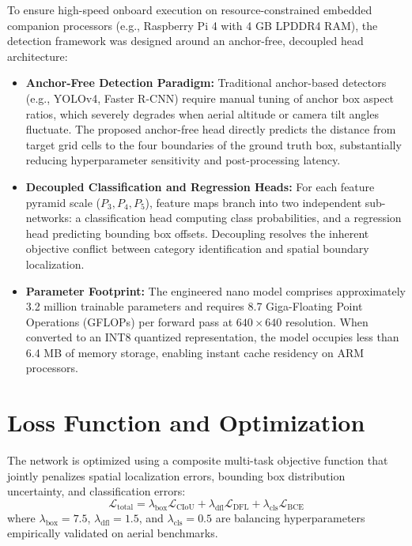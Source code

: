 To ensure high-speed onboard execution on resource-constrained embedded companion processors (e.g., Raspberry Pi 4 with 4 GB LPDDR4 RAM), the detection framework was designed around an anchor-free, decoupled head architecture:
\begin{itemize}
    \item \textbf{Anchor-Free Detection Paradigm:} Traditional anchor-based detectors (e.g., YOLOv4, Faster R-CNN) require manual tuning of anchor box aspect ratios, which severely degrades when aerial altitude or camera tilt angles fluctuate. The proposed anchor-free head directly predicts the distance from target grid cells to the four boundaries of the ground truth box, substantially reducing hyperparameter sensitivity and post-processing latency.
    \item \textbf{Decoupled Classification and Regression Heads:} For each feature pyramid scale ($P_3, P_4, P_5$), feature maps branch into two independent sub-networks: a classification head computing class probabilities, and a regression head predicting bounding box offsets. Decoupling resolves the inherent objective conflict between category identification and spatial boundary localization.
    \item \textbf{Parameter Footprint:} The engineered nano model comprises approximately 3.2 million trainable parameters and requires 8.7 Giga-Floating Point Operations (GFLOPs) per forward pass at $640 \times 640$ resolution. When converted to an INT8 quantized representation, the model occupies less than 6.4 MB of memory storage, enabling instant cache residency on ARM processors.
\end{itemize}

\section{Loss Function and Optimization}

The network is optimized using a composite multi-task objective function that jointly penalizes spatial localization errors, bounding box distribution uncertainty, and classification errors:
\begin{equation}
    \mathcal{L}_{\text{total}} = \lambda_{\text{box}} \mathcal{L}_{\text{CIoU}} + \lambda_{\text{dfl}} \mathcal{L}_{\text{DFL}} + \lambda_{\text{cls}} \mathcal{L}_{\text{BCE}}
\end{equation}
where $\lambda_{\text{box}} = 7.5$, $\lambda_{\text{dfl}} = 1.5$, and $\lambda_{\text{cls}} = 0.5$ are balancing hyperparameters empirically validated on aerial benchmarks.


